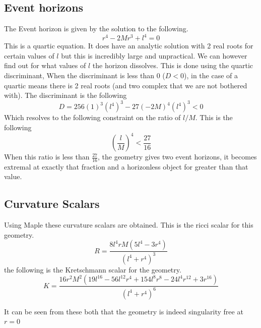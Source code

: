 \documentclass[a4paper,11pt]{article}
\begin{document}
\subsection{Event horizons}
The Event horizon is given by the solution to the following.
\begin{equation}
    r^{4}-2Mr^{3}+l^{4}=0
\end{equation}
This is a quartic equation. It does have an analytic solution with 2 real roots for certain values of $l$ but this is incredibly large and unpractical. We can however find out for what values of $l$ the horizon dissolves. This is done using the quartic discriminant, When the discriminant is less than 0 ($D<0$), in the case of a quartic means there is 2 real roots (and two complex that we are not bothered with). The discriminant is the following
\begin{equation}
    D=256(1)^3(l^4)^3-27(-2M)^4(l^4)^3<0
\end{equation}
Which resolves to the following constraint on the ratio of $l/M$. This is the following
\begin{equation}
(\frac{l}{M})^4<\frac{27}{16}
\end{equation}
When this ratio is less than $\frac{27}{16}$, the geometry gives two event horizons, it becomes extremal at exactly that fraction and a horizonless object for greater than that value.

\subsection{Curvature Scalars}
Using Maple these curvature scalars are obtained. This is the ricci scalar for this geometry. 
\begin{equation}
R=\frac{8 l^{4} r M \left(5 l^{4}-3 r^{4}\right)}{\left(l^{4}+r^{4}\right)^{3}}
\end{equation}
the following is the Kretschmann scalar for the geometry. 
\begin{equation}
K=\frac{16 r^{2} M^{2} \left(19 l^{16}-56 l^{12} r^{4}+154 l^{8} r^{8}-24 l^{4} r^{12}+3 r^{16}\right)}{\left(l^{4}+r^{4}\right)^{6}}
\end{equation}

It can be seen from these both that the geometry is indeed singularity free at $r=0$
\end{document}
